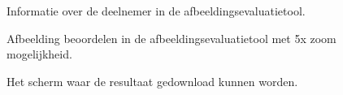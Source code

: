 \FloatBarrier
\begin{figure}[h!]
	\caption{Informatie over de deelnemer in de \gls{afbeeldingsevaluatietool}.}
	\label{fig:bijlages-screenshot-afbeeldingsevaluatietool-over-u}
\end{figure}
\FloatBarrier

\FloatBarrier
\begin{figure}[h!]
	\caption{Afbeelding beoordelen in de \gls{afbeeldingsevaluatietool} met 5x zoom mogelijkheid.}
	\label{fig:bijlages-screenshot-afbeeldingsevaluatietool-evalutie}
\end{figure}
\FloatBarrier

\FloatBarrier
\begin{figure}[h!]
	\caption{Het scherm waar de resultaat gedownload kunnen worden.}
	\label{fig:bijlages-screenshot-afbeeldingsevaluatietool-export}
\end{figure}
\FloatBarrier

